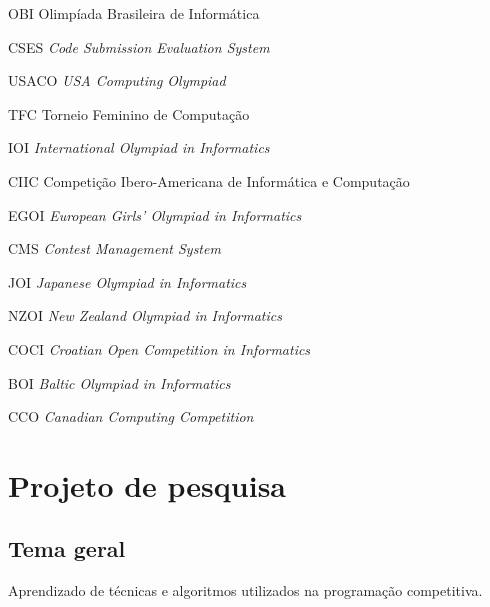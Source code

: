 \documentclass[oneside,12pt,article,a4paper,english,brazil]{abntex2}
\begin{document}
\frenchspacing 


\imprimircapa

\imprimirfolhaderosto


\listoftables*
\cleardoublepage

\begin{siglas}
  \item[OBI] Olimpíada Brasileira de Informática
  \item[CSES] \emph{Code Submission Evaluation System}
  \item[USACO] \emph{USA Computing Olympiad}
  \item[TFC] Torneio Feminino de Computação
  \item[IOI] \emph{International Olympiad in Informatics}
  \item[CIIC] Competição Ibero-Americana de Informática e Computação
  \item[EGOI] \emph{European Girls' Olympiad in Informatics}
  \item[CMS] \emph{Contest Management System}
  \item[JOI] \emph{Japanese Olympiad in Informatics}
  \item[NZOI] \emph{New Zealand Olympiad in Informatics}
  \item[COCI] \emph{Croatian Open Competition in Informatics}
  \item[BOI] \emph{Baltic Olympiad in Informatics}
  \item[CCO] \emph{Canadian Computing Competition}
\end{siglas}

\tableofcontents*
\cleardoublepage

\textual

\chapter*{Projeto de pesquisa}

\section{Tema geral}
Aprendizado de técnicas e algoritmos utilizados na programação competitiva.
\end{document}
